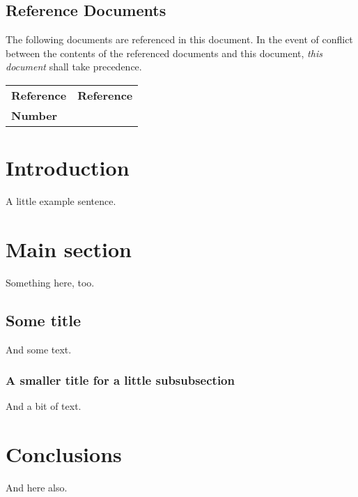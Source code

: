 \documentclass[11pt,a4paper]{article}
\begin{document}
\subsection*{Reference Documents}

The following documents are referenced in this document. In the event of
conflict between the contents of the referenced documents and this document,
\emph{this document} shall take precedence.

\begin{center}{
\begin{tabularx}{\textwidth}{|X|X|}
    \hline
    \bf{Reference} & \bf{Reference}\\
    \bf{Number} & \\
    \hline
\end{tabularx}}
\end{center}




\newpage
\section{Introduction}

A little example sentence.


\clearpage
\section{Main section}
\label{section:main}

Something here, too.


\subsection{Some title}

And some text.

\subsubsection{A smaller title for a little subsubsection}

And a bit of text.


\clearpage
\section{Conclusions}
\label{section:conclusions}

And here also.


\clearpage
{}
%
\end{document}

